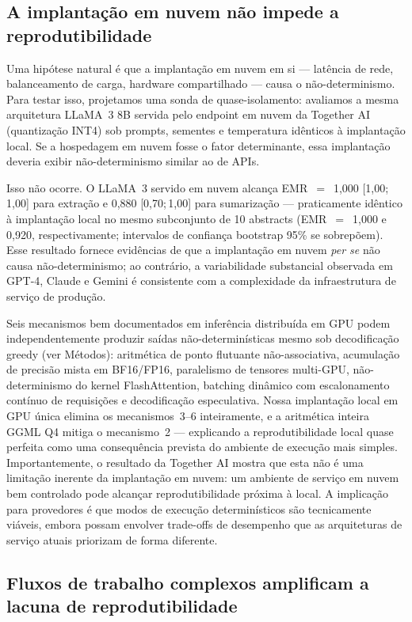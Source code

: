\documentclass[12pt,a4paper]{article}
\begin{document}
\subsection*{A implantação em nuvem não impede a reprodutibilidade}

Uma hipótese natural é que a implantação em nuvem em si --- latência de rede, balanceamento de carga, hardware compartilhado --- causa o não-determinismo.
Para testar isso, projetamos uma sonda de quase-isolamento: avaliamos a mesma arquitetura LLaMA~3 8B servida pelo endpoint em nuvem da Together AI (quantização INT4) sob prompts, sementes e temperatura idênticos à implantação local.
Se a hospedagem em nuvem fosse o fator determinante, essa implantação deveria exibir não-determinismo similar ao de APIs.

Isso não ocorre.
O LLaMA~3 servido em nuvem alcança EMR~$=$~1,000 [1,00;\,1,00] para extração e 0,880 [0,70;\,1,00] para sumarização --- praticamente idêntico à implantação local no mesmo subconjunto de 10 abstracts (EMR~$=$~1,000 e 0,920, respectivamente; intervalos de confiança bootstrap 95\% se sobrepõem).
Esse resultado fornece evidências de que a implantação em nuvem \emph{per se} não causa não-determinismo; ao contrário, a variabilidade substancial observada em GPT-4, Claude e Gemini é consistente com a complexidade da infraestrutura de serviço de produção.

Seis mecanismos bem documentados em inferência distribuída em GPU podem independentemente produzir saídas não-determinísticas mesmo sob decodificação greedy (ver Métodos): aritmética de ponto flutuante não-associativa, acumulação de precisão mista em BF16/FP16, paralelismo de tensores multi-GPU, não-determinismo do kernel FlashAttention, batching dinâmico com escalonamento contínuo de requisições e decodificação especulativa.
Nossa implantação local em GPU única elimina os mecanismos~3--6 inteiramente, e a aritmética inteira GGML Q4 mitiga o mecanismo~2 --- explicando a reprodutibilidade local quase perfeita como uma consequência prevista do ambiente de execução mais simples.
Importantemente, o resultado da Together AI mostra que esta não é uma limitação inerente da implantação em nuvem: um ambiente de serviço em nuvem bem controlado pode alcançar reprodutibilidade próxima à local.
A implicação para provedores é que modos de execução determinísticos são tecnicamente viáveis, embora possam envolver trade-offs de desempenho que as arquiteturas de serviço atuais priorizam de forma diferente.


\subsection*{Fluxos de trabalho complexos amplificam a lacuna de reprodutibilidade}
\end{document}
